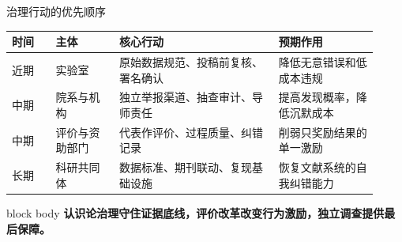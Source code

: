 \documentclass[aspectratio=169,10pt]{ctexbeamer}
\newcommand{\takeaway}[1]{%
  \begin{beamercolorbox}[rounded=true,sep=0.65em,wd=\linewidth]{block body}
    \centering\color{MutedBlue}\textbf{#1}
  \end{beamercolorbox}
}
\begin{document}
\begin{frame}{治理行动的优先顺序}
  \small
  \begin{tabular}{@{}p{0.11\linewidth}p{0.16\linewidth}p{0.40\linewidth}p{0.25\linewidth}@{}}
    \toprule
    \textbf{时间} & \textbf{主体} & \textbf{核心行动} & \textbf{预期作用} \\
    \midrule
    近期 & 实验室 & 原始数据规范、投稿前复核、署名确认 & 降低无意错误和低成本违规 \\
    \addlinespace
    中期 & 院系与机构 & 独立举报渠道、抽查审计、导师责任 & 提高发现概率，降低沉默成本 \\
    \addlinespace
    中期 & 评价与资助部门 & 代表作评价、过程质量、纠错记录 & 削弱只奖励结果的单一激励 \\
    \addlinespace
    长期 & 科研共同体 & 数据标准、期刊联动、复现基础设施 & 恢复文献系统的自我纠错能力 \\
    \bottomrule
  \end{tabular}

  \vspace{0.45cm}
  \takeaway{认识论治理守住证据底线，评价改革改变行为激励，独立调查提供最后保障。}
\end{frame}
\end{document}
